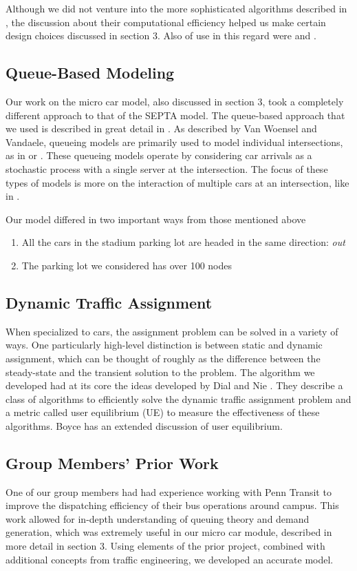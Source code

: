 Although we did not venture into the more sophisticated algorithms
described in \cite{kohler2002time}, the discussion about their
computational efficiency helped us make certain design choices
discussed in section 3. Also of use in this regard were
\cite{xuan2003computing} and \cite{george2008time}.


\subsection{Queue-Based Modeling}
Our work on the micro car model, also discussed in section 3, took a
completely different approach to that of the SEPTA model. The
queue-based approach that we used is described in great detail in
\cite{van2007modeling}. As described by Van Woensel and Vandaele,
queueing models are primarily used to model individual intersections,
as in \cite{ruskin2002modeling} or \cite{kyte2009validating}. These
queueing models operate by considering car arrivals as a stochastic
process with a single server at the intersection. The focus of these
types of models is more on the interaction of multiple cars at an
intersection, like in \cite{prasetijo2012capacity}.

Our model differed in two important ways from those mentioned above

\begin{enumerate}
    \item All the cars in the stadium parking lot are headed in the
  same direction: \emph{out}
    \item The parking lot we considered has over 100 nodes
\end{enumerate}

\subsection{Dynamic Traffic Assignment}
When specialized to cars, the assignment problem can be solved in a
variety of ways. One particularly high-level distinction is between
static and dynamic assignment, which can be thought of roughly as the
difference between the steady-state and the transient solution to the
problem. The algorithm we developed had at its core the ideas
developed by Dial \cite{dial2006path} and Nie
\cite{nie2010class}. They describe a class of algorithms to
efficiently solve the dynamic traffic assignment problem and a metric
called user equilibrium (UE) to measure the effectiveness of these
algorithms. Boyce \cite{boyce2003convergence} has an extended
discussion of user equilibrium.

\subsection{Group Members' Prior Work}
One of our group members had had experience working with Penn Transit
to improve the dispatching efficiency of their bus operations around
campus. This work allowed for in-depth understanding of queuing theory
and demand generation, which was extremely useful in our micro car
module, described in more detail in section 3. Using elements of the
prior project, combined with additional concepts from traffic
engineering, we developed an accurate model.
